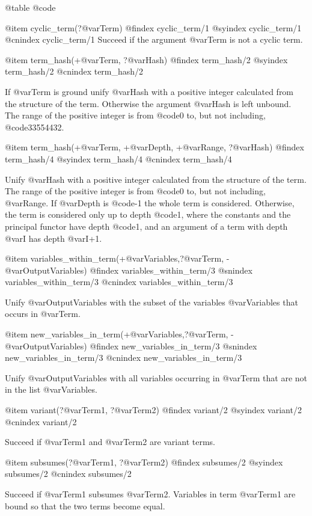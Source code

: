 @table @code

@item cyclic_term(?@var{Term})
@findex cyclic_term/1
@syindex cyclic_term/1
@cnindex cyclic_term/1
Succeed if the argument @var{Term} is not a cyclic term.

@item term_hash(+@var{Term}, ?@var{Hash})
@findex  term_hash/2
@syindex term_hash/2
@cnindex term_hash/2

If @var{Term} is ground unify @var{Hash} with a positive integer
calculated from the structure of the term. Otherwise the argument
@var{Hash} is left unbound. The range of the positive integer is from
@code{0} to, but not including, @code{33554432}.

@item term_hash(+@var{Term}, +@var{Depth}, +@var{Range}, ?@var{Hash})
@findex  term_hash/4
@syindex term_hash/4
@cnindex term_hash/4

Unify @var{Hash} with a positive integer calculated from the structure
of the term.  The range of the positive integer is from @code{0} to, but
not including, @var{Range}. If @var{Depth} is @code{-1} the whole term
is considered. Otherwise, the term is considered only up to depth
@code{1}, where the constants and the principal functor have depth
@code{1}, and an argument of a term with depth @var{I} has depth @var{I+1}. 

@item variables_within_term(+@var{Variables},?@var{Term}, -@var{OutputVariables})
@findex  variables_within_term/3
@snindex variables_within_term/3 
@cnindex variables_within_term/3  

Unify @var{OutputVariables} with the subset of the variables @var{Variables} that occurs in @var{Term}.

@item new_variables_in_term(+@var{Variables},?@var{Term}, -@var{OutputVariables})
@findex  new_variables_in_term/3
@snindex new_variables_in_term/3 
@cnindex new_variables_in_term/3  

Unify @var{OutputVariables} with all variables occurring in @var{Term} that are not in the list @var{Variables}.

@item variant(?@var{Term1}, ?@var{Term2})
@findex  variant/2
@syindex variant/2
@cnindex variant/2

Succeed if @var{Term1} and @var{Term2} are variant terms.

@item subsumes(?@var{Term1}, ?@var{Term2})
@findex  subsumes/2
@syindex subsumes/2
@cnindex subsumes/2

Succeed if @var{Term1} subsumes @var{Term2}.  Variables in term
@var{Term1} are bound so that the two terms become equal.


